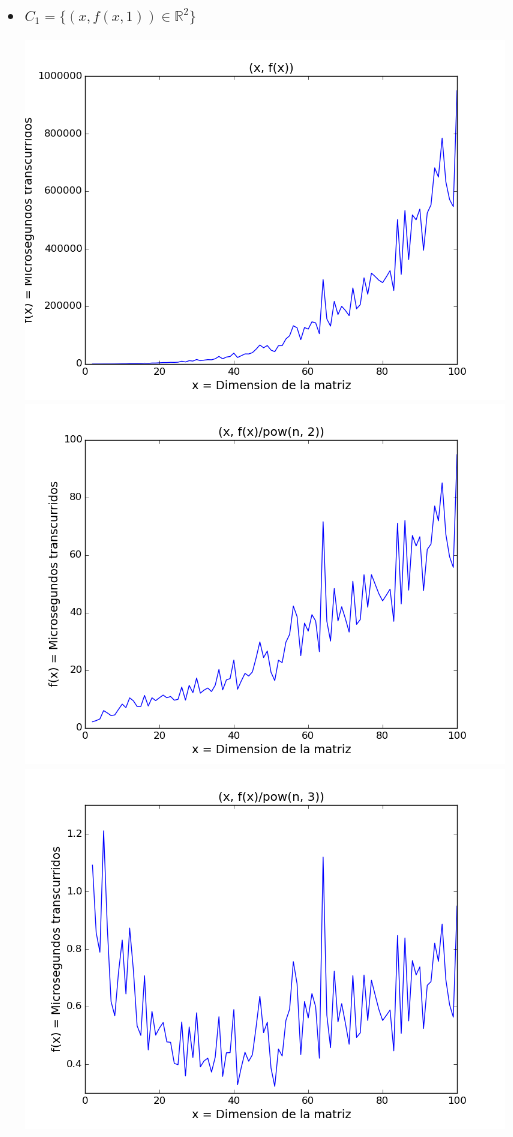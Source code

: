 \begin{itemize}
	\item $C_1 = \{ (x, f(x, 1)) \in \mathbb{R}^2 \}$
	\begin{center}
		\includegraphics[scale=0.54]{images/1potenciafuncion}
		\includegraphics[scale=0.54]{images/1potenciasobrecuadrado}
		\includegraphics[scale=0.54]{images/1potenciasobrecubo}
	\end{center}


\end{itemize}
